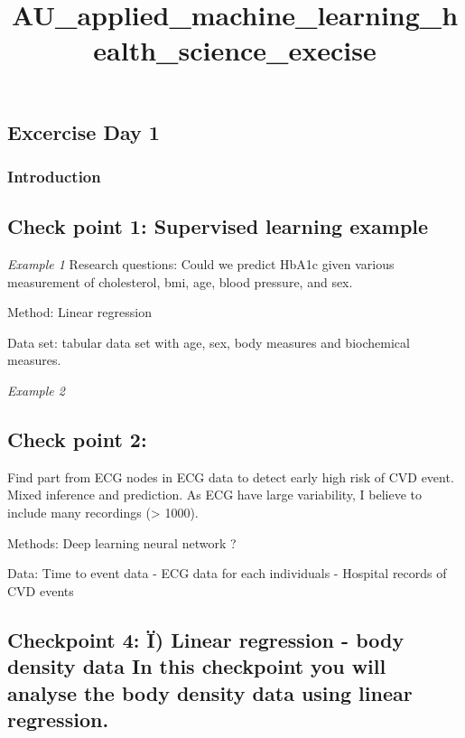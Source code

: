 \documentclass[
  letterpaper,
  DIV=11,
  numbers=noendperiod]{scrartcl}
\title{AU\_applied\_machine\_learning\_health\_science\_execise}
\author{}
\date{}
\begin{document}
\maketitle
\ifdefined\Shaded\renewenvironment{Shaded}{\begin{tcolorbox}[enhanced, frame hidden, borderline west={3pt}{0pt}{shadecolor}, boxrule=0pt, sharp corners, breakable, interior hidden]}{\end{tcolorbox}}\fi

\hypertarget{excercise-day-1}{%
\subsection{Excercise Day 1}\label{excercise-day-1}}

\hypertarget{introduction}{%
\subsubsection{Introduction}\label{introduction}}

\hypertarget{check-point-1-supervised-learning-example}{%
\subsection{Check point 1: Supervised learning
example}\label{check-point-1-supervised-learning-example}}

\emph{Example 1} Research questions: Could we predict HbA1c given
various measurement of cholesterol, bmi, age, blood pressure, and sex.

Method: Linear regression

Data set: tabular data set with age, sex, body measures and biochemical
measures.

\emph{Example 2}

\hypertarget{check-point-2}{%
\subsection{Check point 2:}\label{check-point-2}}

Find part from ECG nodes in ECG data to detect early high risk of CVD
event. Mixed inference and prediction. As ECG have large variability, I
believe to include many recordings (\textgreater{} 1000).

Methods: Deep learning neural network ?

Data: Time to event data - ECG data for each individuals - Hospital
records of CVD events

\hypertarget{checkpoint-4-uxef-linear-regression---body-density-data-in-this-checkpoint-you-will-analyse-the-body-density-data-using-linear-regression.}{%
\subsection{Checkpoint 4: Ï) Linear regression - body density data In
this checkpoint you will analyse the body density data using linear
regression.}\label{checkpoint-4-uxef-linear-regression---body-density-data-in-this-checkpoint-you-will-analyse-the-body-density-data-using-linear-regression.}}
\end{document}
